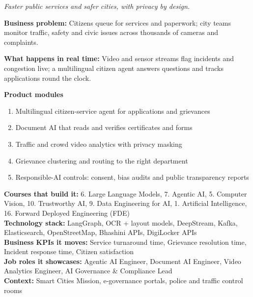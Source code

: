 \documentclass[10pt,a4paper]{article}
\begin{document}
\begin{tcolorbox}[enhanced,breakable,colback=white,colframe=navy,boxrule=0.6pt,arc=2pt,title={\color{goldl}PRODUCT 9 \;|\; GOVERNMENT, SMART CITIES \& PUBLIC SAFETY\\\color{white}\large Citizen Services \& Urban Operations Command Centre},colbacktitle=navy,fonttitle=\small\bfseries]
{\small\itshape\color{muted}Faster public services and safer cities, with privacy by design.}\par
\begin{tcolorbox}[colback=l1bg,colframe=l1bg,arc=2pt,borderline west={3pt}{0pt}{saffron},top=2pt,bottom=2pt]\small\textbf{Business problem:} Citizens queue for services and paperwork; city teams monitor traffic, safety and civic issues across thousands of cameras and complaints.\end{tcolorbox}
\begin{tcolorbox}[colback=l3bg,colframe=l3bg,arc=2pt,borderline west={3pt}{0pt}{igreen},top=2pt,bottom=2pt]\small\textbf{What happens in real time:} Video and sensor streams flag incidents and congestion live; a multilingual citizen agent answers questions and tracks applications round the clock.\end{tcolorbox}
{\small\textbf{Product modules}}\begin{enumerate}\small
\item Multilingual citizen-service agent for applications and grievances
\item Document AI that reads and verifies certificates and forms
\item Traffic and crowd video analytics with privacy masking
\item Grievance clustering and routing to the right department
\item Responsible-AI controls: consent, bias audits and public transparency reports
\end{enumerate}
{\small\textbf{Courses that build it:} 6. Large Language Models, 7. Agentic AI, 5. Computer Vision, 10. Trustworthy AI, 9. Data Engineering for AI, 1. Artificial Intelligence, 16. Forward Deployed Engineering (FDE)\\\textbf{Technology stack:} LangGraph, OCR + layout models, DeepStream, Kafka, Elasticsearch, OpenStreetMap, Bhashini APIs, DigiLocker APIs\\\textbf{Business KPIs it moves:} Service turnaround time, Grievance resolution time, Incident response time, Citizen satisfaction\\\textbf{Job roles it showcases:} Agentic AI Engineer, Document AI Engineer, Video Analytics Engineer, AI Governance \& Compliance Lead\\\textbf{Context:} Smart Cities Mission, e-governance portals, police and traffic control rooms}
\end{tcolorbox}
\end{document}
